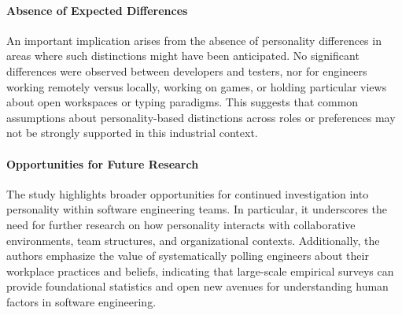 \paragraph{Absence of Expected Differences}
An important implication arises from the absence of personality differences in areas where such distinctions might have been anticipated. No significant differences were observed between developers and testers, nor for engineers working remotely versus locally, working on games, or holding particular views about open workspaces or typing paradigms. This suggests that common assumptions about personality-based distinctions across roles or preferences may not be strongly supported in this industrial context.

\paragraph{Opportunities for Future Research}
The study highlights broader opportunities for continued investigation into personality within software engineering teams. In particular, it underscores the need for further research on how personality interacts with collaborative environments, team structures, and organizational contexts. Additionally, the authors emphasize the value of systematically polling engineers about their workplace practices and beliefs, indicating that large-scale empirical surveys can provide foundational statistics and open new avenues for understanding human factors in software engineering.
